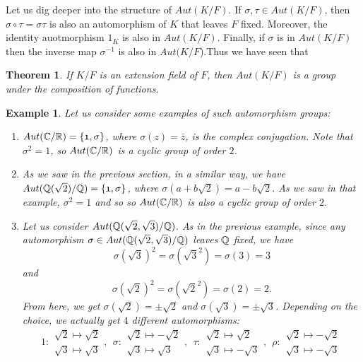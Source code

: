 \documentclass[12pt]{article}
\theoremstyle{plain}
\newtheorem{example}{Example}
\newtheorem{theorem}{Theorem}
\theoremstyle{definition}
\theoremstyle{remark}
\begin{document}
Let us dig deeper into the structure of $Aut(K/F)$. If $\sigma, \tau \in Aut(K/F)$, then $\sigma\circ\tau = \sigma\tau$ is also an automorphism of $K$ that leaves $F$ fixed. Moreover, the identity auotmorphism $\mathfrak{1}_K$ is also in $Aut(K/F)$. Finally, if $\sigma$ is in $Aut(K/F)$ then the inverse map $\sigma^{-1}$ is also in $Aut(K/F$).Thus we have seen that
\begin{theorem}
If $K/F$ is an extension field of $F$, then $Aut(K/F)$ is a group under the composition of functions.
\end{theorem}
\begin{example}
Let us consider some examples of such automorphism groups:
\begin{enumerate}
\item $Aut(\mathbb{C}/\mathbb{R}) = \{\mathfrak{1}, \sigma\}$, where $\sigma(z) = \bar{z}$, is the complex conjugation. Note that $\sigma^2=\mathfrak{1}$, so $Aut(\mathbb{C}/\mathbb{R})$ is a cyclic group of order $2$.
\item As we saw in the previous section, in a similar way, we have $Aut(\mathbb{Q}(\sqrt{2})/\mathbb{Q})=\{\mathfrak{1}, \sigma\}$, where
$\sigma(a+b\sqrt{2})=a-b\sqrt{2}$. As we saw in that example, $\sigma^2=\mathfrak{1}$ and so so $Aut(\mathbb{C}/\mathbb{R})$ is also a cyclic group of order $2$.
\item Let us consider $Aut(\mathbb{Q}(\sqrt{2}, \sqrt{3})/\mathbb{Q})$.
As in the previous example, since any automorphism $\sigma \in Aut(\mathbb{Q}(\sqrt{2}, \sqrt{3})/\mathbb{Q})$ leaves $\mathbb{Q}$ fixed, we have
$$\sigma(\sqrt{3})^2=\sigma(\sqrt{3}^2)=\sigma(3)=3$$ and
$$\sigma(\sqrt{2})^2=\sigma(\sqrt{2}^2)=\sigma(2)=2.$$
From here, we get $\sigma(\sqrt{2})=\pm\sqrt{2}$ and $\sigma(\sqrt{3}) = \pm\sqrt{3}$. Depending on the choice, we actually get $4$ different automorphisms:
$$\mathfrak{1}:\begin{array}{c}
      \sqrt{2} \mapsto \sqrt{2}\\
      \sqrt{3} \mapsto \sqrt{3}
\end{array}, \:\: \mathfrak{\sigma}:\begin{array}{c}
      \sqrt{2} \mapsto -\sqrt{2}\\
      \sqrt{3} \mapsto \sqrt{3}
\end{array}, \:\: \mathfrak{\tau}:\begin{array}{c}
      \sqrt{2} \mapsto \sqrt{2}\\
      \sqrt{3} \mapsto -\sqrt{3}
\end{array}, \:\: \mathfrak{\rho}:\begin{array}{c}
      \sqrt{2} \mapsto -\sqrt{2}\\
      \sqrt{3} \mapsto -\sqrt{3}
\end{array}$$


\end{enumerate}
\end{example}
\end{document}
